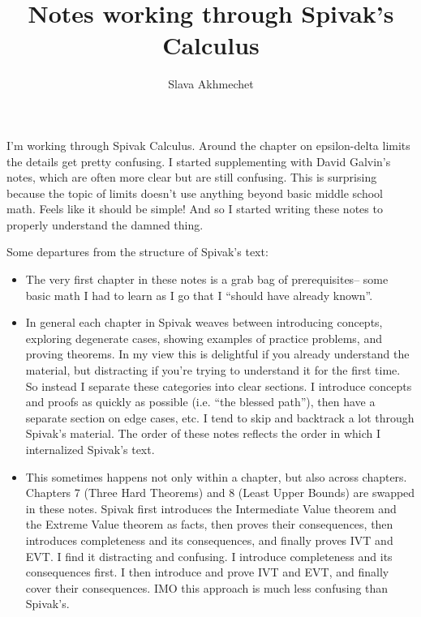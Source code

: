 \documentclass{article}
\title{Notes working through Spivak's Calculus}
\author{Slava Akhmechet}
\begin{document}
\maketitle

I'm working through Spivak Calculus. Around the chapter on
epsilon-delta limits the details get pretty confusing. I started
supplementing with David Galvin's notes, which are often more clear
but are still confusing. This is surprising because the topic of
limits doesn't use anything beyond basic middle school math. Feels
like it should be simple! And so I started writing these notes to
properly understand the damned thing.

\vs

Some departures from the structure of Spivak's text:
\begin{itemize}
\item The very first chapter in these notes is a grab bag of
  prerequisites-- some basic math I had to learn as I go that I
  ``should have already known''.
\item In general each chapter in Spivak weaves between introducing
  concepts, exploring degenerate cases, showing examples of practice
  problems, and proving theorems. In my view this is delightful if you
  already understand the material, but distracting if you're trying to
  understand it for the first time. So instead I separate these
  categories into clear sections. I introduce concepts and proofs as
  quickly as possible (i.e. ``the blessed path''), then have a
  separate section on edge cases, etc. I tend to skip and backtrack a
  lot through Spivak's material. The order of these notes reflects the
  order in which I internalized Spivak's text.
\item This sometimes happens not only within a chapter, but also
  across chapters. Chapters 7 (Three Hard Theorems) and 8 (Least Upper
  Bounds) are swapped in these notes. Spivak first introduces the
  Intermediate Value theorem and the Extreme Value theorem as facts,
  then proves their consequences, then introduces completeness and its
  consequences, and finally proves IVT and EVT. I find it distracting
  and confusing. I introduce completeness and its consequences first.
  I then introduce and prove IVT and EVT, and finally cover their
  consequences. IMO this approach is much less confusing than
  Spivak's.
\end{itemize}

\clearpage
\tableofcontents

\clearpage

\clearpage

\clearpage

\clearpage

\clearpage

\clearpage

\clearpage

\clearpage

\clearpage

\end{document}
